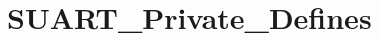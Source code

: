\hypertarget{group___s_u_a_r_t___private___defines}{}\section{S\+U\+A\+R\+T\+\_\+\+Private\+\_\+\+Defines}
\label{group___s_u_a_r_t___private___defines}
